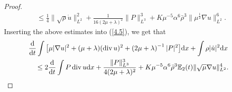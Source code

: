 \documentclass[10pt,a4paper]{amsart}
\DeclareMathOperator{\divv}{div}
\begin{document}
\begin{proof}
\begin{align*}
& \leq \frac{1}{4} \|\sqrt{\rho} \dot{u}\|_{L^2}^2 + \frac{1}{16 (2 \mu + \lambda )^2} \|P\|_{L^3}^3 + K \mu^{-5} \alpha^6 \bar{\rho}^3 \|\mu^{\frac{1}{2}} \nabla u\|_{L^2}^6.
\end{align*}
Inserting the above estimates into (\ref{4.5}), we get that
\begin{align}\label{4.6}
& \frac{\mathrm{d}}{\mathrm{d} t} \int \big[ \mu |\nabla u|^2 + (\mu + \lambda )(\divv u)^2 + \left( 2 \mu + \lambda \right)^{-1}|P|^2 \big] \mathrm{d} x + \int \rho |\dot{u}|^2 \mathrm{d} x\notag \\
& \quad \leq 2 \frac{\mathrm{d}}{\mathrm{d} t} \int P \divv u \mathrm{d} x + \frac{\|P\|_{L^3}^3}{4 (2 \mu + \lambda )^2} + K \mu^{-5} \alpha^6 \bar{\rho}^3 \mathbb{E}_2 (t) \|\sqrt{\mu}\nabla u\|_{L^2}^4.
\end{align}


\end{proof}
\end{document}
